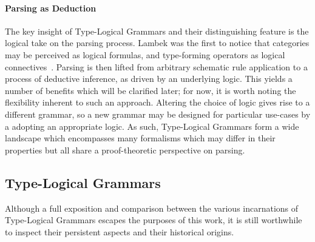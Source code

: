 \paragraph{Parsing as Deduction}
The key insight of Type-Logical Grammars and their distinguishing feature is the logical take on the parsing process.
Lambek was the first to notice that categories may be perceived as logical formulas, and type-forming operators as logical connectives~\cite{lambek1958mathematics}.
Parsing is then lifted from arbitrary schematic rule application to a process of deductive inference, as driven by an underlying logic.
This yields a number of benefits which will be clarified later; for now, it is worth noting the flexibility inherent to such an approach.
Altering the choice of logic gives rise to a different grammar, so a new grammar may be designed for particular use-cases by a adopting an appropriate logic.
As such, Type-Logical Grammars form a wide landscape which encompasses many formalisms which may differ in their properties but all share a proof-theoretic perspective on parsing.

\subsection{Type-Logical Grammars}
Although a full exposition and comparison between the various incarnations of Type-Logical Grammars escapes the purposes of this work, it is still worthwhile to inspect their persistent aspects and their historical origins.

